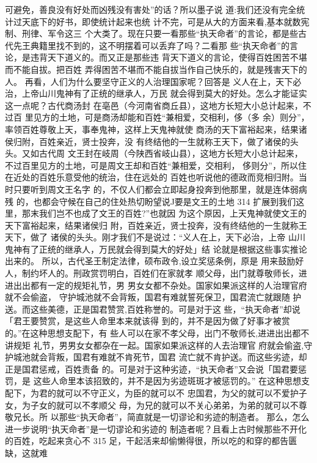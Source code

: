可避免，善良没有好处而凶残没有害处”的话？所以墨子说
道:我们还没有完全统计过天底下的好书，即使统计起来也统
计不完，可是从大的方面来看,基本就数宪制、刑律、军令这三
个大类了。现在只要一看那些“执天命者”的言论，都是些古
代先王典籍里找不到的，这不明摆着可以丢弃了吗？二看那
些“执天命者”的言论，是违背天下道义的。而又正是那些违
背天下道义的言论，使得百姓困苦不堪而不能自拔。把百姓
弄得困苦不堪而不能自拔当作自己快乐的，就是残害天下的
人。
再看，人们为什么要坚守正义的人治理国家呢？回答是
义人在上，天下必治，上帝山川鬼神有了正统的继承人，万民
就会得到莫大的好处。怎么才能证实这一点呢？古代商汤封
在亳邑（今河南省商丘县），这地方长短大小总计起来，不过百
里见方的土地，可是商汤却能和百姓“兼相爱，交相利，侈（多
余）则分”，率领百姓尊敬上天，事奉鬼神，这样上天鬼神就使
商汤的天下富裕起来，结果诸侯归附，百姓亲近，贤士投奔，没
有终结他的一生就称王天下，做了诸侯的头头。又如古代周
文王封在岐周（今陕西省岐山县），这地方长短大小总计起来，
不过百里见方的土地，可是周文王却和百姓“兼相爱，交相利，
侈则分”，所以住在近处的百姓乐意受他的统治，住在远处的
百姓也听说他的德政而竞相归附。当时只要听到周文王名字
的，不仅人们都会立即起身投奔到他那里，就是连体弱病残
的，也都会守候在自己的住处热切盼望说J要是文王的土地
314 
扩展到我们这里，那末我们岂不也成了文王的百姓?”也就因
为这个原因，上天鬼神就使文王的天下富裕起来，结果诸侯归
附，百姓亲近，贤士投奔，没有终结他的一生就称王天下，做了
诸侯的头头。刚才我们不是说过：“义人在上，天下必治，上帝
山川鬼神有了正统的继承人，万民就会得到莫大的好处」结
论就是根据这些事实推论出来的。
所以，古代圣王制定法律，硕布政令,设立奖惩条例，原是
用来鼓励好人，制约坏人的。刑政赏罚明白，百姓们在家就孝
顺父母，出门就尊敬师长，进进出出都有一定的规矩礼节，男
男女女都不杂处。国家如果派这样的人治理官府就不会偷盗，
守护城池就不会背叛，国君有难就誓死保卫，国君流亡就跟随
护送。而这些美德，正是国君赞赏,百姓称誉的。可是对于这
些，“执天命者”却说「君王要赞赏，是这些人命里本来就该得
到的，并不是因为做了好事才被赏的。”在这种思想支配下，有
些人可以在家不孝父母，出门不敬师长,进进出出都不讲规矩
礼节，男男女女都杂在一起。国家如果派这样的人去治理官
府就会偷盗,守护城池就会背叛，国君有难就不肯死节，国君
流亡就不肯护送。而这些劣迹，却正是国君惩戒，百姓责备
的。可是对于这种劣迹，“执天命者”又会说「国君要惩罚，是
这些人命里本该招致的，并不是因为劣迹斑斑才被惩罚的。”
在这种思想支配下，为君的就可以不守正义，为臣的就可以不
忠国君，为父的就可以不爱护子女，为子女的就可以不孝顺父
母，为兄的就可以不关心弟弟，为弟的就可以不尊敬兄长。所
以那些“执天命者”，简直就是一切谬论和劣迹的制造者。
那么，怎么进一步说明“执天命者”是一切谬论和劣迹的
制造者呢？且看上古时候那些不开化的百姓，吃起来贪心不
315
足，干起活来却偷懒得很，所以吃的和穿的都告匮缺，这就难

